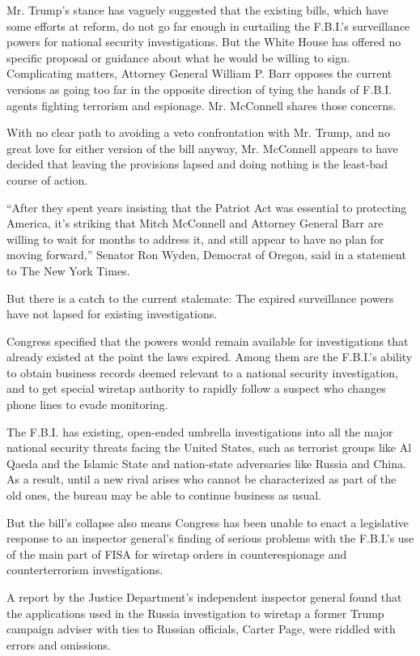 Mr. Trump's stance has vaguely suggested that the existing bills, which
have some efforts at reform, do not go far enough in curtailing the
F.B.I.'s surveillance powers for national security investigations. But
the White House has offered no specific proposal or guidance about what
he would be willing to sign. Complicating matters, Attorney General
William P. Barr opposes the current versions as going too far in the
opposite direction of tying the hands of F.B.I. agents fighting
terrorism and espionage. Mr. McConnell shares those concerns.

With no clear path to avoiding a veto confrontation with Mr. Trump, and
no great love for either version of the bill anyway, Mr. McConnell
appears to have decided that leaving the provisions lapsed and doing
nothing is the least-bad course of action.

``After they spent years insisting that the Patriot Act was essential to
protecting America, it's striking that Mitch McConnell and Attorney
General Barr are willing to wait for months to address it, and still
appear to have no plan for moving forward,'' Senator Ron Wyden, Democrat
of Oregon, said in a statement to The New York Times.

But there is a catch to the current stalemate: The expired surveillance
powers have not lapsed for existing investigations.

Congress specified that the powers would remain available for
investigations that already existed at the point the laws expired. Among
them are the F.B.I.'s ability to obtain business records deemed relevant
to a national security investigation, and to get special wiretap
authority to rapidly follow a suspect who changes phone lines to evade
monitoring.

The F.B.I. has existing, open-ended umbrella investigations into all the
major national security threats facing the United States, such as
terrorist groups like Al Qaeda and the Islamic State and nation-state
adversaries like Russia and China. As a result, until a new rival arises
who cannot be characterized as part of the old ones, the bureau may be
able to continue business as usual.

But the bill's collapse also means Congress has been unable to enact a
legislative response to an inspector general's finding of serious
problems with the F.B.I.'s use of the main part of FISA for wiretap
orders in counterespionage and counterterrorism investigations.

A report by the Justice Department's independent inspector general found
that the applications used in the Russia investigation to wiretap a
former Trump campaign adviser with ties to Russian officials, Carter
Page, were riddled with errors and omissions.


